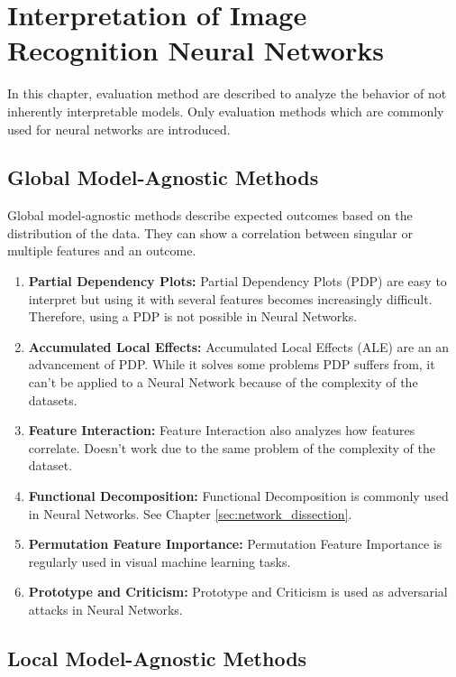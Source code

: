 \chapter{Interpretation of Image Recognition Neural Networks}

In this chapter, evaluation method are described to analyze the behavior of not inherently interpretable models. Only evaluation methods which are commonly used for neural networks are introduced.

\section{Global Model-Agnostic Methods}

Global model-agnostic methods describe expected outcomes based on the distribution of the data. They can show a correlation between singular or multiple features and an outcome.

\begin{enumerate}
	\item \textbf{Partial Dependency Plots:} Partial Dependency Plots (PDP) are easy to interpret but using it with several features becomes increasingly difficult. Therefore, using a PDP is not possible in Neural Networks.
	\item \textbf{Accumulated Local Effects:} Accumulated Local Effects (ALE) are an an advancement of PDP. While it solves some problems PDP suffers from, it can't be applied to a Neural Network because of the complexity of the datasets.
	\item \textbf{Feature Interaction:} Feature Interaction also analyzes how features correlate. Doesn't work due to the same problem of the complexity of the dataset.
	\item \textbf{Functional Decomposition:} Functional Decomposition is commonly used in Neural Networks. See Chapter \ref{sec:network_dissection}.
	\item \textbf{Permutation Feature Importance:} Permutation Feature Importance is regularly used in visual machine learning tasks.
	\item \textbf{Prototype and Criticism:} Prototype and Criticism is used as adversarial attacks in Neural Networks.
	
\end{enumerate}


\section{Local Model-Agnostic Methods}


